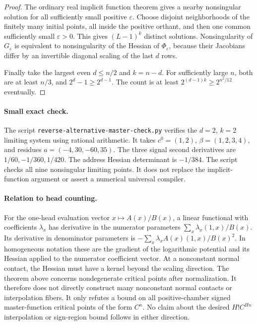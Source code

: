 \documentclass[11pt]{article}
\begin{document}
\begin{proof}
The ordinary real implicit function theorem gives a nearby nonsingular
solution for all sufficiently small positive $\varepsilon$. Choose
disjoint neighborhoods of the finitely many initial points, all inside
the positive orthant, and then one common sufficiently small
$\varepsilon>0$. This gives $(L-1)^k$ distinct solutions. Nonsingularity
of $G_\varepsilon$ is equivalent to nonsingularity of the Hessian of
$\Phi_\varepsilon$, because their Jacobians differ by an invertible
diagonal scaling of the last $d$ rows.

Finally take the largest even $d\leq n/2$ and $k=n-d$. For sufficiently
large $n$, both are at least $n/3$, and $2^d-1\geq2^{d-1}$.
The count is at least $2^{(d-1)k}\geq2^{n^2/12}$ eventually.
\end{proof}

\paragraph{Small exact check.}
The script \texttt{reverse-alternative-master-check.py} verifies the
$d=2$, $k=2$ limiting system using rational arithmetic. It takes
$c^0=(1,2)$, $\beta=(1,2,3,4)$, and residues
$a=(-4,30,-60,35)$. The three signal second derivatives are
$1/60,-1/360,1/420$. The address Hessian determinant is $-1/384$.
The script checks all nine nonsingular limiting points. It does not
replace the implicit-function argument or assert a numerical universal
compiler.

\paragraph{Relation to head counting.}
For the one-head evaluation vector $x\mapsto A(x)/B(x)$, a linear
functional with coefficients $\lambda_x$ has derivative in the numerator
parameters $\sum_x\lambda_x(1,x)/B(x)$. Its derivative in denominator
parameters is $-\sum_x\lambda_x A(x)(1,x)/B(x)^2$.
In homogeneous notation these are the gradient of the logarithmic
potential and its Hessian applied to the numerator coefficient vector.
At a nonconstant normal contact, the Hessian must have a kernel beyond
the scaling direction. The theorem above concerns nondegenerate
critical points after normalization. It therefore does not directly
construct many nonconstant normal contacts or interpolation fibers.
It only refutes a bound on all positive-chamber signed master-function
critical points of the form $C^n$. No claim about the desired
$H!C^{Hn}$ interpolation or sign-region bound follows in either direction.
\end{document}
